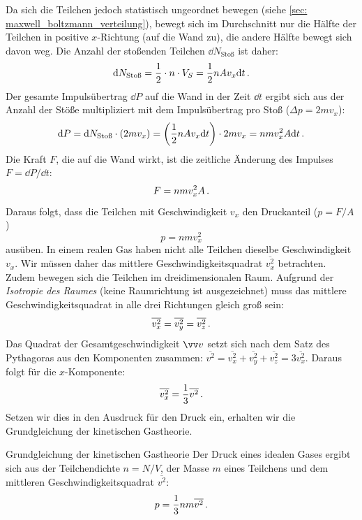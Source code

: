 Da sich die Teilchen jedoch statistisch ungeordnet bewegen (siehe \cref{sec: maxwell_boltzmann_verteilung}), bewegt sich im Durchschnitt nur die Hälfte der Teilchen in positive $x$-Richtung (auf die Wand zu), die andere Hälfte bewegt sich davon weg. Die Anzahl der stoßenden Teilchen $\dd N_{\text{Stoß}}$ ist daher:
\begin{equation}
    \mathrm{d} N_{\text{Stoß}} = \frac{1}{2} \cdot n \cdot V_S = \frac{1}{2} n A v_x \mathrm{d} t \,.
\end{equation}
Der gesamte Impulsübertrag $\dd P$ auf die Wand in der Zeit $\dd t$ ergibt sich aus der Anzahl der Stöße multipliziert mit dem Impulsübertrag pro Stoß ($\Delta p = 2mv_x$):
\begin{equation}
    \mathrm{d} P = \mathrm{d} N_{\text{Stoß}} \cdot (2 m v_x) = \left( \frac{1}{2} n A v_x \mathrm{d} t \right) \cdot 2 m v_x = n m v_x^2 A \mathrm{d} t \,.
\end{equation}
Die Kraft $F$, die auf die Wand wirkt, ist die zeitliche Änderung des Impulses $F = \dd P / \dd t$:
\begin{equation}
    F = n m v_x^2 A \,.
\end{equation}
Daraus folgt, dass die Teilchen mit Geschwindigkeit $v_x$ den Druckanteil ($p = F/A$)
\begin{equation}
    p = n m v_x^2
\end{equation}
ausüben. In einem realen Gas haben nicht alle Teilchen dieselbe Geschwindigkeit $v_x$. Wir müssen daher das mittlere Geschwindigkeitsquadrat $\overline{v_x^2}$ betrachten. Zudem bewegen sich die Teilchen im dreidimensionalen Raum. Aufgrund der \textit{Isotropie des Raumes} (keine Raumrichtung ist ausgezeichnet) muss das mittlere Geschwindigkeitsquadrat in alle drei Richtungen gleich groß sein:
\begin{equation}
    \overline{v_x^2} = \overline{v_y^2} = \overline{v_z^2} \,.
\end{equation}
Das Quadrat der Gesamtgeschwindigkeit $\ivec{v}$ setzt sich nach dem Satz des Pythagoras aus den Komponenten zusammen: $\overline{v^2} = \overline{v_x^2} + \overline{v_y^2} + \overline{v_z^2} = 3 \overline{v_x^2}$.
Daraus folgt für die $x$-Komponente:
\begin{equation}
    \overline{v_x^2} = \frac{1}{3} \overline{v^2} \,.
\end{equation}
Setzen wir dies in den Ausdruck für den Druck ein, erhalten wir die Grundgleichung der kinetischen Gastheorie.

\begin{importantbox}{Grundgleichung der kinetischen Gastheorie}
    Der Druck eines idealen Gases ergibt sich aus der Teilchendichte $n=N/V$, der Masse $m$ eines Teilchens und dem mittleren Geschwindigkeitsquadrat $\overline{v^2}$:
    \begin{equation}\label{eq: grundglg_kinetische_gastheorie}
        p = \frac{1}{3} n m \overline{v^2} \,.
    \end{equation}
\end{importantbox}

